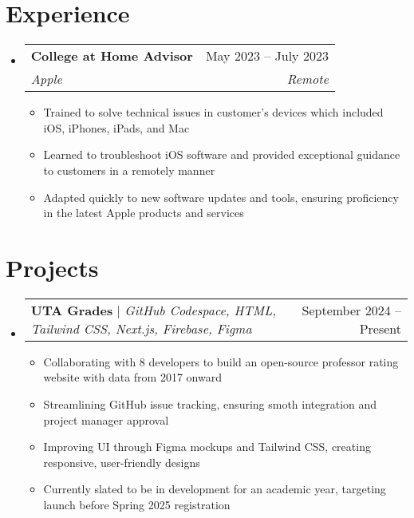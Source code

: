 \documentclass[letterpaper,11pt]{article}
\makeatletter
\newcommand{\resumeItem}[1]{
  \item\small{
    {#1 \vspace{-2pt}}
  }
}
\newcommand{\resumeSubheading}[4]{
  \vspace{-2pt}\item
    \begin{tabular*}{0.97\textwidth}[t]{l@{\extracolsep{\fill}}r}
      \textbf{#1} & #2 \\
      \textit{\small#3} & \textit{\small #4} \\
    \end{tabular*}\vspace{-7pt}
}
\newcommand{\resumeSubSubheading}[2]{
    \item
    \begin{tabular*}{0.97\textwidth}{l@{\extracolsep{\fill}}r}
      \textit{\small#1} & \textit{\small #2} \\
    \end{tabular*}\vspace{-7pt}
}
\newcommand{\resumeProjectHeading}[2]{
    \item
    \begin{tabular*}{0.97\textwidth}{l@{\extracolsep{\fill}}r}
      \small#1 & #2 \\
    \end{tabular*}\vspace{-7pt}
}
\newcommand{\resumeSubHeadingListStart}{\begin{itemize}[leftmargin=0.15in, label={}]}
\newcommand{\resumeSubHeadingListEnd}{\end{itemize}}
\newcommand{\resumeItemListStart}{\begin{itemize}}
\newcommand{\resumeItemListEnd}{\end{itemize}\vspace{-5pt}}
\makeatother
\begin{document}
\section{Experience}
  \resumeSubHeadingListStart

    \resumeSubheading
      {College at Home Advisor}{May 2023 -- July 2023}
      {Apple}{Remote}
      \resumeItemListStart
        \resumeItem{Trained to solve technical issues in customer's devices which included iOS, iPhones, iPads, and Mac}
        \resumeItem{Learned to troubleshoot iOS software and provided exceptional guidance to customers in a remotely manner}
        \resumeItem{Adapted quickly to new software updates and tools, ensuring proficiency in the latest Apple products and services }
        \resumeItemListEnd
    \resumeSubHeadingListEnd



\section{Projects}

\resumeSubHeadingListStart
\resumeProjectHeading
    {\textbf{UTA Grades} $|$ \emph{GitHub Codespace, HTML, Tailwind CSS, Next.js, Firebase, Figma}}{September 2024 -- Present}
    \resumeItemListStart
      \resumeItem{Collaborating with 8 developers to build an open-source professor rating website with data from 2017 onward}
      \resumeItem{Streamlining GitHub issue tracking, ensuring smoth integration and project manager approval}
      \resumeItem{Improving UI through Figma mockups and Tailwind CSS, creating responsive, user-friendly designs}
      \resumeItem{Currently slated to be in development for an academic year, targeting launch before
      Spring 2025 registration}
    \resumeItemListEnd
\resumeSubHeadingListEnd

\end{document}
